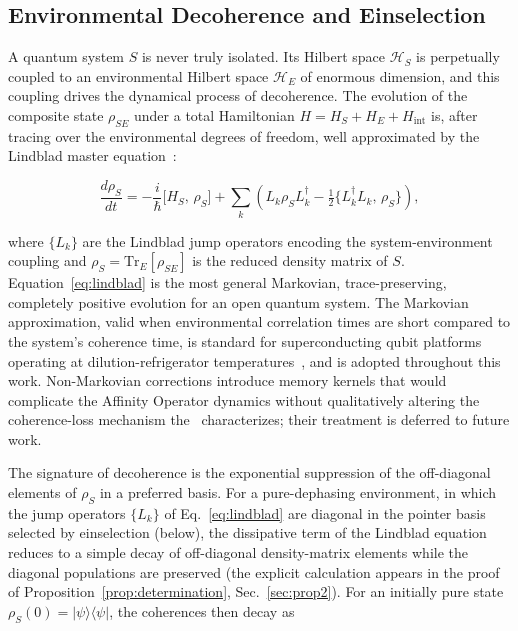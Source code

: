 
\subsection{\label{sec:decoherence}Environmental Decoherence and Einselection}

A quantum system $S$ is never truly isolated.
Its Hilbert space $\mathcal{H}_S$ is perpetually coupled to an
environmental Hilbert space $\mathcal{H}_E$ of enormous dimension, and
this coupling drives the dynamical process of decoherence.
The evolution of the composite state $\rho_{SE}$ under a total
Hamiltonian $H = H_S + H_E + H_{\mathrm{int}}$ is, after tracing over
the environmental degrees of freedom, well approximated by the
Lindblad master equation~\cite{Lindblad1976,GKS1976,NielsenChuang2000}:

\begin{equation}
\label{eq:lindblad}
\frac{d\rho_S}{dt}
  = -\frac{i}{\hbar}\bigl[H_S,\, \rho_S\bigr]
    + \sum_k \!\left(
        L_k \rho_S L_k^{\dagger}
        - \tfrac{1}{2}\bigl\{ L_k^{\dagger} L_k,\, \rho_S \bigr\}
      \right),
\end{equation}

\noindent
where $\{L_k\}$ are the Lindblad jump operators encoding the
system-environment coupling and $\rho_S = \mathrm{Tr}_E[\rho_{SE}]$
is the reduced density matrix of $S$.
Equation~\eqref{eq:lindblad} is the most general Markovian,
trace-preserving, completely positive evolution for an open quantum
system.
The Markovian approximation, valid when environmental correlation times are short compared to the system's coherence time, is standard
for superconducting qubit platforms operating at dilution-refrigerator
temperatures~\cite{Krantz2019}, and is adopted throughout this work.
Non-Markovian corrections introduce memory kernels that would complicate
the Affinity Operator dynamics without qualitatively altering the
coherence-loss mechanism the \RCF~characterizes; their treatment is
deferred to future work.

The signature of decoherence is the exponential suppression of the
off-diagonal elements of $\rho_S$ in a preferred basis.
For a pure-dephasing environment, in which the jump operators $\{L_k\}$
of Eq.~\eqref{eq:lindblad} are diagonal in the pointer basis selected
by einselection (below), the dissipative term of the Lindblad equation
reduces to a simple decay of off-diagonal density-matrix elements while
the diagonal populations are preserved
(the explicit calculation appears in the proof of
Proposition~\ref{prop:determination}, Sec.~\ref{sec:prop2}).
For an initially pure state $\rho_S(0) = \vert\psi\rangle\langle\psi\vert$,
the coherences then decay as

